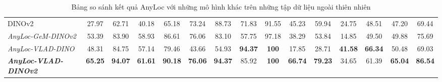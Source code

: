 \begin{table}[H]
{\begin{tabular}{lcccccccccccccc}
      DINOv2                                 & 27.97                                                        & 62.71                                                               & 40.18                                                          & 65.18                                                            & 73.24                                                       & 88.73                                                                                                             & 71.83                                 & 91.55                    & 45.23                    & 59.94                    & 24.75                    & 48.51                    & 47.20                    & 69.44                    \\
      \rowcolor[HTML]{FFCE93}
      \textit{AnyLoc-GeM-DINOv2}             & 53.39                                                        & 83.90                                                               & 58.93                                                          & 86.61                                                            & 76.06                                                       & 83.10                                                                                                             & 57.75                                 & 97.18                    & 38.29                    & 53.84                    & 14.85                    & 49.50                    & 49.88                    & 75.69                    \\
      \rowcolor[HTML]{FFCE93}
      \textit{AnyLoc-VLAD-DINO}              & 48.31                                                        & 84.75                                                               & 57.14                                                          & 79.46                                                            & 43.66                                                       & 54.93                                                                                                             & \textbf{94.37}                        & \textbf{100}             & 17.85                    & 28.71                    & \textbf{41.58}           & \textbf{66.34}           & 50.48                    & 69.03                    \\
      \rowcolor[HTML]{FFCE93}
      \textit{\textbf{AnyLoc-VLAD-DINOv2}}   & \textbf{65.25}                                               & \textbf{94.07}                                                      & \textbf{61.61}                                                 & \textbf{90.18}                                                   & \textbf{76.06}                                              & \textbf{94.37}                                                                                                    & 85.92                                 & \textbf{100}             & \textbf{66.74}           & \textbf{79.23}           & 34.65                    & 61.39                    & \textbf{65.04}           & \textbf{86.54}
    \end{tabular}}
  \caption{Bảng so sánh kết quả AnyLoc với những mô hình khác trên những tập dữ liệu ngoài thiên nhiên}
\end{table}

